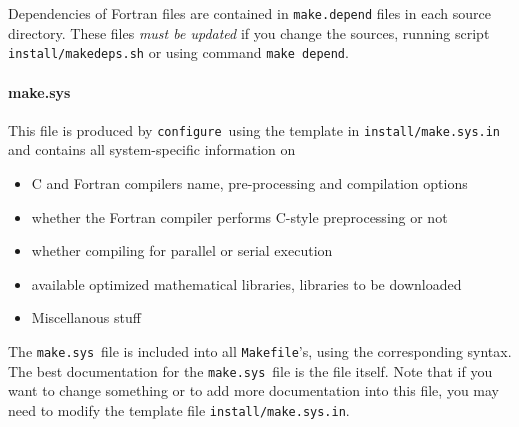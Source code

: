 \documentclass[12pt,a4paper]{article}
\def\configure{\texttt{configure}}
\def\make.sys{\texttt{make.sys}}
\def\Makefile{\texttt{Makefile}}
\begin{document}
Dependencies of Fortran files are contained in \texttt{make.depend} files
in each source directory. These files {\em must be updated} if you change
the sources, running script \texttt{install/makedeps.sh} or using command
\texttt{make depend}.

\paragraph{make.sys}
This file is produced by \configure\ using the template in 
\texttt{install/make.sys.in} and contains all system-specific 
information on
\begin{itemize}
\item C and Fortran compilers name, pre-processing and compilation options
\item whether the Fortran compiler performs C-style preprocessing or not
\item whether compiling for parallel or serial execution
\item available optimized mathematical libraries, libraries to be downloaded
\item Miscellanous stuff
\end{itemize}
The \make.sys\ file is included into all \Makefile's, 
using the corresponding syntax. The best documentation for the 
\make.sys\ file is the file itself. Note that if you want to
change something or to add more documentation into this file,
you may need to modify the template file \texttt{install/make.sys.in}. 
\end{document}
